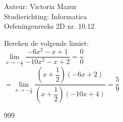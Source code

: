 \documentclass[a4paper]{article}
\begin{document}
  
\noindent \large Auteur: Victoria Mazur \\
\noindent \large Studierichting: Informatica\\
\noindent \large Oefeningenreeks 2D nr. 10.12\\

\medskip

\normalsize

Bereken de volgende limiet: \\

$\lim\limits_{x \rightarrow -\tfrac{1}{2}} \dfrac{-6x^2 - x + 1}{-10x^2 - x + 2} = \dfrac{0}{0}$ \\

$= \lim\limits_{x \rightarrow -\tfrac{1}{2}} \dfrac{\left(x + \dfrac{1}{2}\right)(-6x + 2)}{\left(x + \dfrac{1}{2}\right)(-10x + 4)} = \dfrac{5}{9}$ \\

\begin{thebibliography}{999}
\end{thebibliography}
\end{document}
